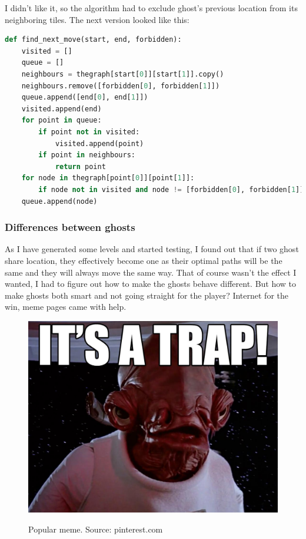 \documentclass[11pt,a4paper,notitlepage]{report}
\newenvironment{img}{
	\begin{center}
		\begin{figure}[H]
			\begin{center}
			
}{
	\end{center}
		\end{figure}
			\end{center}
}
\begin{document}
					I didn't like it, so the algorithm had to exclude ghost's previous location from its neighboring tiles. The next version looked like this:
					\begin{lstlisting}[language=Python]
def find_next_move(start, end, forbidden):
    visited = []
    queue = []
    neighbours = thegraph[start[0]][start[1]].copy()
    neighbours.remove([forbidden[0], forbidden[1]])
    queue.append([end[0], end[1]])
    visited.append(end)
    for point in queue:
        if point not in visited:
            visited.append(point)
        if point in neighbours:
            return point
    for node in thegraph[point[0]][point[1]]:
        if node not in visited and node != [forbidden[0], forbidden[1]]:
    queue.append(node)
					\end{lstlisting}
				\subsubsection{Differences between ghosts}
					\label{hunting}
					As I have generated some levels and started testing, I found out that if two ghost share location, they effectively become one as their optimal paths will be the same and they will always move the same way. That of course wasn't the effect I wanted, I had to figure out how to make the ghosts behave different. But how to make ghosts both smart and not going straight for the player? Internet for the win, meme pages came with help.
					\begin{img}
						\includegraphics[width=350pt]{images/trap}\\
						\caption{Popular meme. Source: pinterest.com}
						\label{trap}
					\end{img}
\end{document}
